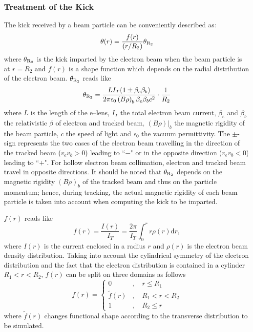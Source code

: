\documentclass[english]{article}
\begin{document}
\subsubsection{Treatment of the Kick}
The kick received by a beam particle can be conveniently described as:
\begin{equation}
\theta(r)=\frac{f(r)}{(r/R_2)} \theta_{\rm R_2}
\end{equation}
where $\theta_{\rm R_2}$ is the kick imparted by the electron beam when the beam particle
is at $r=R_2$ and $f(r)$ is a shape function which depends on the radial distribution of the
electron beam.
$\theta_{\rm R_2}$ reads like
\begin{equation}
\theta_{\rm R_2} = \frac{LI_T(1\pm\beta_e\beta_b)}{2\pi\epsilon_0  \left(B\rho\right)_b\beta_e\beta_b c^2}\cdot\frac{1}{R_2}
\end{equation}
where $L$ is the length of the e--lens, $I_T$ the total electron beam current, $\beta_{e}$ and $\beta_{b}$ the relativistic $\beta$ of electron and tracked beam, $(B\rho)|_b$ the magnetic rigidity of the beam particle, $c$ the speed of light and $\epsilon_0$ the vacuum permittivity. The $\pm$-sign represents the two cases of the electron beam travelling in the direction of the tracked beam ($v_e v_b>0$) leading to ``$-$" or in the opposite direction ($v_e v_b<0$) leading to ``$+$". For hollow electron beam collimation, electron and tracked beam travel in opposite directions. It should be noted that $\theta_{\rm R_2}$ depends on the magnetic rigidity $(B\rho)_b$ of the tracked beam and thus on the particle momentum; hence, during tracking, the actual magnetic rigidity of each beam particle is taken into account when computing the kick to be imparted.

$f(r)$ reads like
\begin{equation}
  f(r) = \frac{I(r)}{I_T}=\frac{2\pi}{I_T}\int_{0}^r r\rho(r) \mathrm{d}r,
  \label{elense:eqn:1}
\end{equation}
where $I(r)$ is the current enclosed in a radius
$r$ and $\rho(r)$ is the electron beam density distribution. Taking into account the
cylindrical symmetry of the electron distribution and the fact that the electron
distribution is contained in a cylinder $R_1<r<R_2$, $f(r)$ can be split on three domains
as follows
\begin{equation}
f(r) =
\begin{cases} 0 &,\quad r \leq R_1\\
\tilde f(r) &,\quad R_1 < r < R_2\\
1 &,\quad R_2 \leq r
\end{cases}
\end{equation}
where $\tilde f(r)$ changes functional shape according to the transverse distribution
to be simulated.
\end{document}
